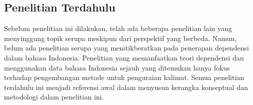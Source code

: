 \subsection{Penelitian Terdahulu}

Sebelum penelitian ini dilakukan, telah ada beberapa penelitian lain yang menyinggung topik serupa meskipun dari perspektif yang berbeda. Namun, belum ada penelitian serupa yang menitikberatkan pada penerapan dependensi dalam bahasa Indonesia. Penelitian yang memanfaatkan teori dependensi dan menggunakan data bahasa Indonesia sejauh yang ditemukan hanya fokus terhadap pengembangan metode untuk penguraian kalimat. Semua penelitian terdahulu ini menjadi referensi awal dalam menyusun kerangka konseptual dan metodologi dalam penelitian ini.

